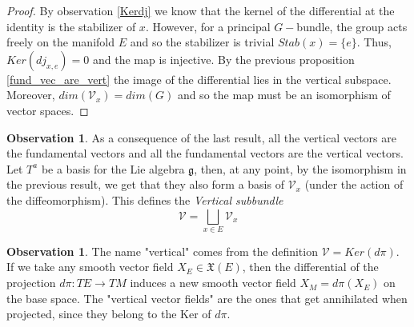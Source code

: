 \documentclass[12pt,a4paper]{report}
\theoremstyle{definition}
\theoremstyle{Theorem}
\theoremstyle{definition}
\theoremstyle{definition}
\newtheorem{Obs}[Def]{Observation}
\begin{document}
	\begin{proof}
		By observation \ref{Kerdj} we know that the kernel of the differential at the identity is the stabilizer of $x$. However, for a principal $G-$bundle, the group acts freely on the manifold $E$ and so the stabilizer is trivial $Stab(x)=\{e\}$. Thus, $Ker (dj_{x,e})=0$ and the map is injective. By the previous proposition \ref{fund_vec_are_vert} the image of the differential lies in the vertical subspace. Moreover, $dim(\mathcal{V}_{x})=dim(G)$ and so the map must be an isomorphism of vector spaces.			
	\end{proof}
	\begin{Obs}
		As a consequence of the last result, all the vertical vectors are the fundamental vectors and all the fundamental vectors are the vertical vectors.\\
		Let $T^a$ be a basis for the Lie algebra $\mathfrak{g}$, then, at any point, by the isomorphism in the previous result, we get that they also form a basis of $\mathcal{V}_{x}$ (under the action of the diffeomorphism). This defines the \textit{Vertical subbundle} $$\mathcal{V}=\bigsqcup_{x\in E}\mathcal{V}_{x}$$
	\end{Obs}
	\begin{Obs}
		The name "vertical" comes from the definition $\mathcal{V}=Ker(d\pi)$. If we take any smooth vector field $X_E\in\mathfrak{X}(E)$, then the differential of the projection $d\pi:TE\rightarrow TM$ induces a new smooth vector field $X_M=d\pi (X_E)$ on the base space. The "vertical vector fields" are the ones that get annihilated when projected, since they belong to the Ker of $d\pi$.
	\end{Obs}
\end{document}
